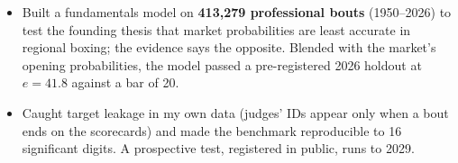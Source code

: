 \documentclass[letterpaper,10pt]{article}
\newif\ifresume
\newcommand{\rs}[2]{\ifresume#1\else#2\fi}
\newenvironment{points}
  {\begin{itemize}[leftmargin=1.1em,label=\textbullet,itemsep=0.12em,parsep=0pt,topsep=0.12em,partopsep=0pt]}
  {\end{itemize}}
\begin{document}
\begin{points}
  \item \rs{Tested on \textbf{413,279 bouts} whether regional and club boxing is priced less efficiently: where priced, it is not. Blended into the opening price, the model passed a pre-registered backtest at {\boldmath$e = 41.8$} against a bar of 20 (2026 holdout).}%
          {Built a fundamentals model on \textbf{413,279 professional bouts} (1950--2026) to test the founding thesis that market probabilities are least accurate in regional boxing; the evidence says the opposite. Blended with the market's opening probabilities, the model passed a pre-registered 2026 holdout at {\boldmath$e = 41.8$} against a bar of 20.}
  \ifresume\else
  \item Caught target leakage in my own data (judges' IDs appear only when a bout ends on the scorecards) and made the benchmark reproducible to 16 significant digits. A prospective test, registered in public, runs to 2029.
  \fi
\end{points}
\end{document}

